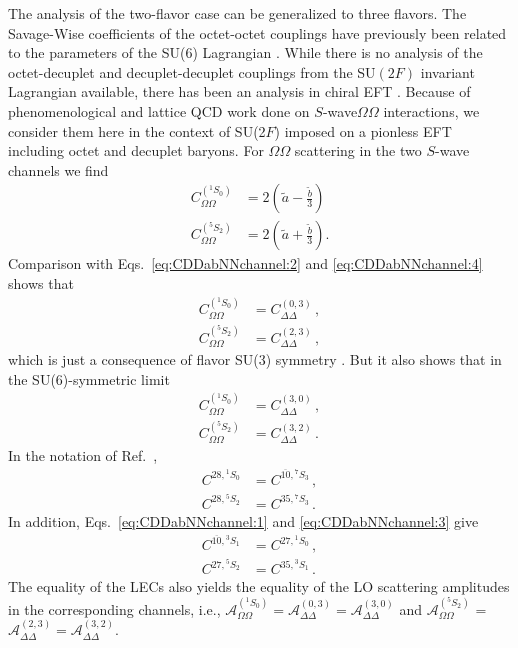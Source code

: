 \documentclass[nofootinbib, preprint, aps, prc, superscriptaddress,11pt]{revtex4-1}
\newcommand{\oneS}{\ensuremath{{{}^{1}\!S_0}}\xspace}
\newcommand{\threeS}{\ensuremath{{{}^{3}\!S_1}}\xspace}
\newcommand{\fiveS}{\ensuremath{{{}^{5}\!S_2}}\xspace}
\newcommand{\sevenS}{\ensuremath{{{}^{7}\!S_3}}\xspace}
\newcommand\Swave{$S$-wave\xspace}
\newcommand{\calA}{\ensuremath{\mathcal{A}}}
\newcommand{\1}{\mathbbm{1}}
\newcommand{\at}{\ensuremath{\tilde{a}}\xspace}
\newcommand{\bt}{\ensuremath{\tilde{b}}\xspace}
\newcommand{\CDDoneSIthree}{C_{\DD}^{(0,3)}}
\newcommand{\CDDfiveSIthree}{C_{\DD}^{(2,3)}}
\newcommand{\CDDsevenSIzero}{C_{\DD}^{(3,0)}}
\newcommand{\CDDsevenSItwo}{C_{\DD}^{(3,2)}}
\newcommand{\COOoneS}{C_{\OO}^{(\oneS)}}
\newcommand{\COOfiveS}{C_{\OO}^{(\fiveS)}}
\newcommand{\DD}{\ensuremath{\Delta\Delta}\xspace}
\newcommand{\OO}{\ensuremath{\Omega\Omega}\xspace}
\begin{document}
The analysis of  the two-flavor case can be generalized to three flavors.
The Savage-Wise coefficients of the octet-octet couplings \cite{Savage:1995kv} have previously been related to the parameters of the SU(6) Lagrangian \cite{Kaplan:1995yg}. 
While there is no analysis of the octet-decuplet and decuplet-decuplet couplings from the SU$(2 F)$ invariant Lagrangian available, there has been an analysis in chiral EFT \cite{Haidenbauer:2017sws}.
Because of phenomenological and lattice QCD work done on \Swave \OO interactions, we consider them here in the context of SU(2$F$) imposed on a pionless EFT including octet and decuplet baryons.
For \OO scattering in the two \Swave channels we find 
    \begin{align}
    \label{eq:COOspinzero}
         \COOoneS &= 2\left(\at - \frac{\bt}{3}\right) \\
    \label{Eq:COOspintwo}
        \COOfiveS &= 2\left(\at + \frac{\bt}{3}\right)  .
    \end{align}
Comparison with Eqs.~\eqref{eq:CDDabNNchannel:2} and \eqref{eq:CDDabNNchannel:4} shows that 
\begin{align}
    \label{eq:OODDEq1} \COOoneS &= \CDDoneSIthree \, ,\\ 
    \COOfiveS &= \CDDfiveSIthree \, ,
\end{align}
which is just a consequence of flavor SU(3) symmetry \cite{Haidenbauer:2017sws}. But it also shows that in the SU(6)-symmetric limit 
\begin{align}
    \label{eq:OODDEq2} \COOoneS & = \CDDsevenSIzero \, , \\
    \COOfiveS & = \CDDsevenSItwo \, .
\end{align}
In the notation of Ref.~\cite{Haidenbauer:2017sws}, 
\begin{align}
    C^{28,\oneS} &= C^{\overline{10},\sevenS} \, ,\\
    C^{28,\fiveS} &= C^{35,\sevenS} \, .
\end{align}
In addition, Eqs.~\eqref{eq:CDDabNNchannel:1} and \eqref{eq:CDDabNNchannel:3} give
\begin{align}
    C^{\overline{10},\threeS} & = C^{27,\oneS} \, , \\
    C^{27,\fiveS} &= C^{35,\threeS} \, . 
\end{align}
The equality of the LECs also yields the equality of the LO scattering amplitudes in the corresponding channels, i.e., $\calA_{\OO}^{(\oneS)} = \calA_{\DD}^{(0,3)} = \calA_{\DD}^{(3,0)}$ and $\calA_{\OO}^{(\fiveS)}$ = $\calA_{\DD}^{(2,3)} = \calA_{\DD}^{(3,2)}$. 
\end{document}
